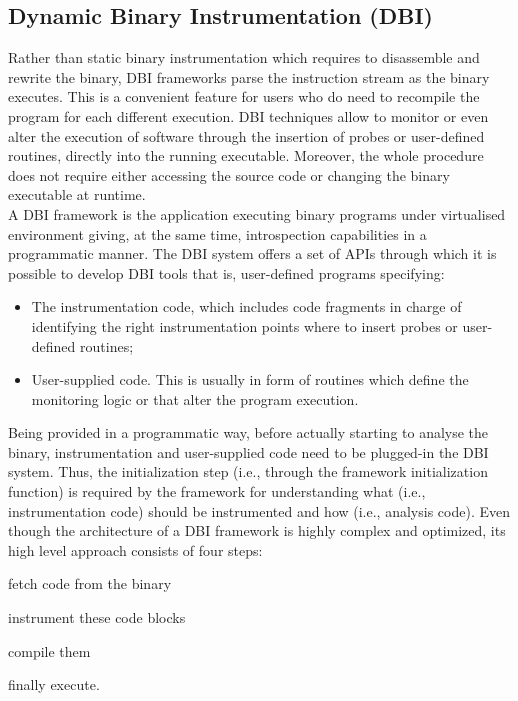 \documentclass[LaM,binding=0.6cm]{sapthesis}
\begin{document}
\subsection{Dynamic Binary Instrumentation (DBI)}
\label{subsec:dbi}
Rather than static binary instrumentation which requires to disassemble and rewrite the binary, DBI frameworks parse the instruction stream as the binary executes. This is a convenient feature for users who do need to recompile the program for each different execution\cite{nethercote2007valgrind}. DBI techniques allow to monitor or even alter the execution of software through the insertion of probes or user-defined routines, directly into the running executable\cite{d2019sok}. Moreover, the whole procedure does not require either accessing the source code or changing the binary executable at runtime.\\
A DBI framework is the application executing binary programs under virtualised environment giving, at the same time, introspection capabilities in a programmatic manner. The DBI system offers a set of APIs through which it is possible to develop DBI tools that is, user-defined programs specifying:
\begin{itemize}
\item The instrumentation code, which includes code fragments in charge of identifying the right instrumentation points where to insert probes or user-defined routines;
\item User-supplied code. This is usually in form of routines which define the monitoring logic or that alter the program execution.
\end{itemize}
Being provided in a programmatic way, before actually starting to analyse the binary, instrumentation and user-supplied code need to be plugged-in the DBI system. Thus, the initialization step (i.e., through the framework initialization function) is required by the framework for understanding what (i.e., instrumentation code) should be instrumented and how (i.e., analysis code). Even though the architecture of a DBI framework is highly complex and optimized, its high level approach consists of four steps: 
\begin{enumerate*}[label=\roman*),itemjoin={,\quad}]
\item fetch code from the binary
\item instrument these code blocks
\item compile them
\item finally execute.
\end{enumerate*}
\end{document}
